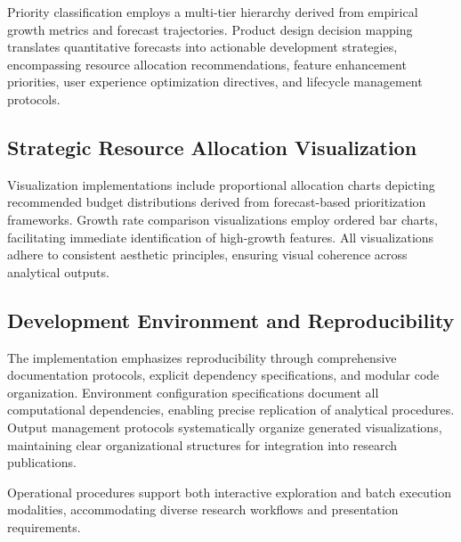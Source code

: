 Priority classification employs a multi-tier hierarchy derived from empirical growth metrics and forecast trajectories. Product design decision mapping translates quantitative forecasts into actionable development strategies, encompassing resource allocation recommendations, feature enhancement priorities, user experience optimization directives, and lifecycle management protocols.

\subsection{Strategic Resource Allocation Visualization}
Visualization implementations include proportional allocation charts depicting recommended budget distributions derived from forecast-based prioritization frameworks. Growth rate comparison visualizations employ ordered bar charts, facilitating immediate identification of high-growth features. All visualizations adhere to consistent aesthetic principles, ensuring visual coherence across analytical outputs.

\subsection{Development Environment and Reproducibility}
The implementation emphasizes reproducibility through comprehensive documentation protocols, explicit dependency specifications, and modular code organization. Environment configuration specifications document all computational dependencies, enabling precise replication of analytical procedures. Output management protocols systematically organize generated visualizations, maintaining clear organizational structures for integration into research publications.

Operational procedures support both interactive exploration and batch execution modalities, accommodating diverse research workflows and presentation requirements.

